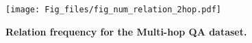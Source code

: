 \begin{figure}[t]
 \centering
  \texttt{[image: Fig\_files/fig\_num\_relation\_2hop.pdf]}
  \caption{\textbf{Relation frequency for the Multi-hop QA dataset.}}
  \label{num_relation_hop2}
\end{figure}
